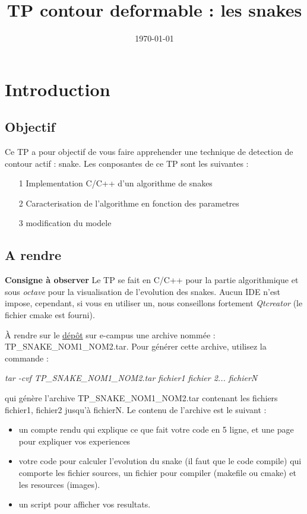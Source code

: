\documentclass[10pt,a4paper]{article}
\title{TP contour deformable : les snakes}
\author{} %
\date{\today}
\begin{document}
\maketitle

\section{Introduction} 

\subsection{Objectif}
Ce TP a pour objectif de vous faire apprehender une technique de detection de contour actif : snake. Les conposantes de ce TP sont les suivantes :
\begin{itemize}
	\item[1] Implementation C/C++ d'un algorithme de snakes
	\item[2] Caracterisation de l'algorithme en fonction des parametres
	\item[3] modification du modele
\end{itemize}

\subsection{A rendre}



\noindent\textbf{Consigne \`{a} observer} Le TP se fait en C/C++ pour la partie algorithmique et sous \textit{octave} pour la visualisation de l'evolution des snakes. Aucun IDE n'est impose, cependant, si vous en utiliser un, nous conseillons fortement \textit{Qtcreator} (le fichier cmake est fourni).


\`{A} rendre sur le \href{https://e-campus.cpe.fr}{d\'{e}p\^{o}t} sur e-campus une archive nomm\'{e}e : TP\_SNAKE\_NOM1\_NOM2.tar. Pour g\'{e}n\'{e}rer cette archive, utilisez la commande : 
\begin{center} 
	\textit{tar -cvf TP\_SNAKE\_NOM1\_NOM2.tar fichier1 fichier 2... fichierN}
\end{center}
qui g\'{e}n\`{e}re l'archive TP\_SNAKE\_NOM1\_NOM2.tar contenant les fichiers fichier1, fichier2 jusqu'\`a fichierN. Le contenu de l'archive est le suivant : 
\begin{itemize}
	\item un compte rendu qui explique ce que fait votre code en 5 ligne, et une page pour expliquer vos experiences
	\item votre code pour calculer l'evolution du snake (il faut que le code compile) qui comporte les fichier sources, un fichier pour compiler (makefile ou cmake) et les resources (images).
	\item un script pour afficher vos resultats.
\end{itemize}
\end{document}
